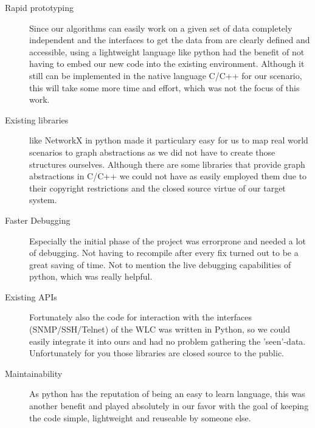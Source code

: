     \begin{description}
      \item [Rapid prototyping]
      Since our algorithms can easily work on a given set of data completely independent and the interfaces to get the data from are clearly defined and accessible,
      using a lightweight language like python had the benefit of not having to embed our new code into the existing environment. Although it still can be implemented 
      in the native language C/C++ for our scenario, this will take some more time and effort, which was not the focus of this work.
      \item[Existing libraries]
      like NetworkX in python made it particulary easy for us to map real world scenarios to graph abstractions as we did not have to create those structures ourselves.
      Although there are some libraries that provide graph abstractions in C/C++ we could not have as easily employed them due to their copyright restrictions and 
      the closed source virtue of our target system.
      \item[Faster Debugging]
      Especially the initial phase of the project was errorprone and needed a lot of debugging. Not having to recompile after every fix turned out to be
      a great saving of time. Not to mention the live debugging capabilities of python, which was really helpful.
      \item[Existing APIs]
      Fortunately also the code for interaction with the interfaces (SNMP/SSH/Telnet) of the WLC was written in Python, so we could easily 
      integrate it into ours and had no problem gathering the 'seen'-data. Unfortunately for you those libraries are closed source to the public.
      \item[Maintainability]
      As python has the reputation of being an easy to learn language, this was another benefit and played absolutely in our favor with the goal of
      keeping the code simple, lightweight and reuseable by someone else.
    \end{description}
    
    \newpage
    
